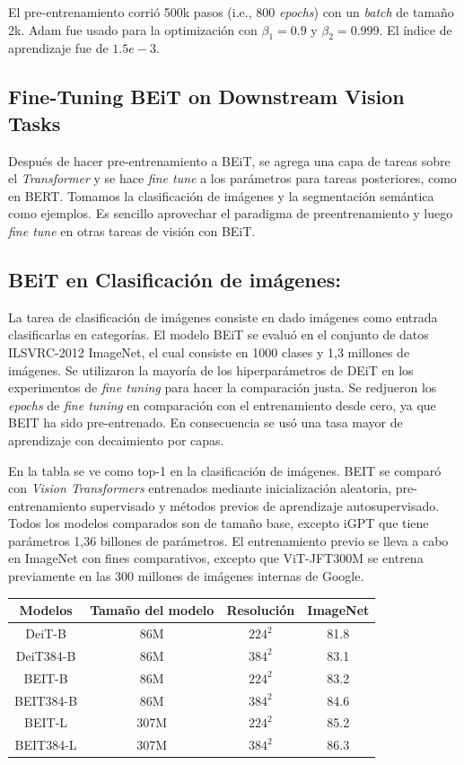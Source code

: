 El pre-entrenamiento corrió 500k pasos (i.e., 800 \textit{epochs}) con un \textit{batch} de tamaño 2k. Adam fue usado para la optimización con $\beta_{1} = 0.9$ y $\beta_{2} = 0.999$. El índice de aprendizaje fue de $1.5e-3$.

\subsection{Fine-Tuning BEiT on Downstream Vision Tasks}
Después de hacer pre-entrenamiento a BEiT, se agrega una capa de tareas sobre el \textit{Transformer} y se hace \textit{fine tune} a los parámetros para tareas posteriores, como en BERT. Tomamos la clasificación de imágenes y la segmentación semántica como ejemplos. Es sencillo aprovechar el paradigma de preentrenamiento y luego \textit{fine tune} en otras tareas de visión con BEiT.

\subsection{BEiT en Clasificación de imágenes:}

La tarea de clasificación de imágenes consiste en dado imágenes como entrada clasificarlas en categorías. El modelo BEiT se evaluó en el conjunto de datos ILSVRC-2012 ImageNet, el cual consiste en 1000 clases y 1,3 millones de imágenes. Se utilizaron la mayoría de los hiperparámetros de DEiT en los experimentos de \textit{fine tuning} para hacer la comparación justa. Se redjueron los \textit{epochs} de \textit{fine tuning} en comparación con el entrenamiento desde cero, ya que BEIT ha sido pre-entrenado. En consecuencia se usó una tasa mayor de aprendizaje con decaimiento por capas.

En la tabla se ve como top-1 en la clasificación de imágenes. BEIT se comparó con \textit{Vision Transformers} entrenados mediante inicialización aleatoria, pre-entrenamiento supervisado y métodos previos de aprendizaje autosupervisado. Todos los modelos comparados son de tamaño base, excepto iGPT que tiene parámetros 1,36 billones de parámetros. El entrenamiento previo se lleva a cabo en ImageNet con fines comparativos, excepto que ViT-JFT300M se entrena previamente en las 300 millones de imágenes internas de Google.

\begin{center}
    \begin{tabular}{||c c c c ||} 
        \hline
        Modelos & Tamaño del modelo & Resolución & ImageNet \\ [0.5ex] 
        \hline\hline
        DeiT-B & 86M & $224^2$ & 81.8 \\ 
        \hline
        DeiT384-B & 86M & $384^2$ & 83.1 \\
        \hline
        BEIT-B & 86M & $224^2$ & 83.2 \\
        \hline
        BEIT384-B & 86M & $384^2$ & 84.6 \\
        \hline
        BEIT-L & 307M & $224^2$ & 85.2 \\
        \hline
        BEIT384-L & 307M & $384^2$ & 86.3 \\ [1ex] 
        \hline
    \end{tabular}
\end{center}

